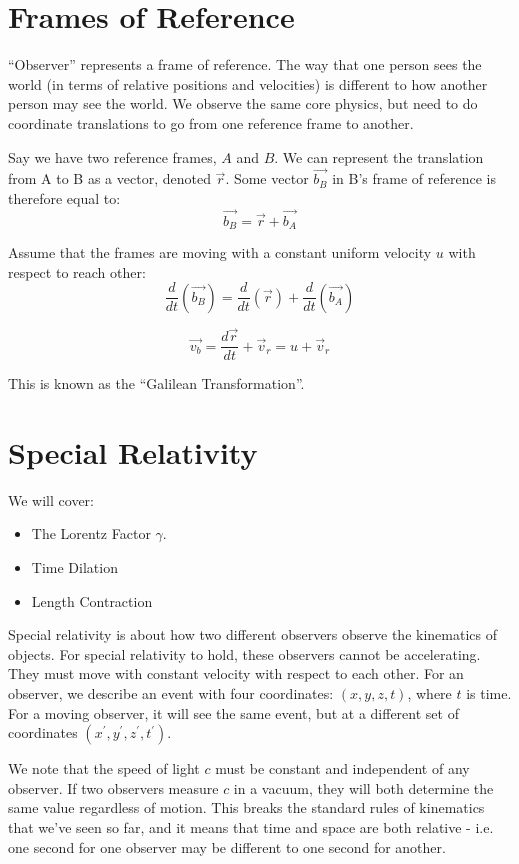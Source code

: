 \section{Frames of Reference}
``Observer'' represents a frame of reference. The way that one person sees the world (in terms of relative positions and velocities) is different to how another person may see the world. We observe the same core physics, but need to do coordinate translations to go from one reference frame to another.

Say we have two reference frames, $A$ and $B$. We can represent the translation from A to B as a vector, denoted $\vec{r}$. Some vector $\vec{b_B}$ in B's frame of reference is therefore equal to:
\[
    \vec{b_B} = \vec{r} + \vec{b_A}
\]

Assume that the frames are moving with a constant uniform velocity $u$ with respect to reach other:
\[
    \frac{d}{dt}(\vec{b_B}) = \frac{d}{dt}(\vec{r}) + \frac{d}{dt}(\vec{b_A})
\]

\[
    \vec{v_b} = \frac{d \vec{r}}{dt} + \vec{v}_r = u + \vec{v}_r
\]

This is known as the ``Galilean Transformation''.

\section{Special Relativity}
We will cover:
\begin{itemize}
    \item The Lorentz Factor $\gamma$.
    \item Time Dilation
    \item Length Contraction
\end{itemize}

Special relativity is about how two different observers observe the kinematics of objects. For special relativity to hold, these observers cannot be accelerating. They must move with constant velocity with respect to each other. For an observer, we describe an event with four coordinates: $(x, y, z, t)$, where $t$ is time. For a moving observer, it will see the same event, but at a different set of coordinates $(x^\prime, y^\prime, z^\prime, t^\prime)$.

We note that the speed of light $c$ must be constant and independent of any observer. If two observers measure $c$ in a vacuum, they will both determine the same value regardless of motion. This breaks the standard rules of kinematics that we've seen so far, and it means that time and space are both relative - i.e. one second for one observer may be different to one second for another.

